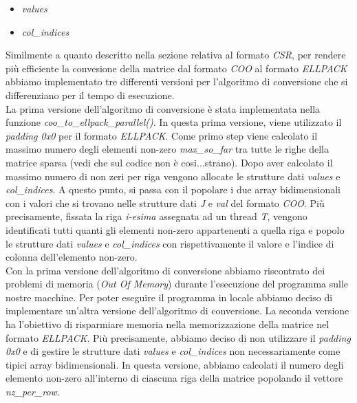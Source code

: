 \documentclass{article}
\begin{document}
\begin{itemize}
\item \textit{values}
\item \textit{col\_indices}
\end{itemize}

Similmente a quanto descritto nella sezione relativa al formato \textit{CSR}, per rendere più efficiente la convesione della matrice dal formato \textit{COO} al formato \textit{ELLPACK} abbiamo implementato tre differenti versioni per l'algoritmo di conversione che si differenziano per il tempo di esecuzione.\\

La prima versione dell'algoritmo di conversione è stata implementata nella funzione \textit{coo\_to\_ellpack\_parallel()}. In questa prima versione, viene utilizzato il \textit{padding 0x0} per il formato \textit{ELLPACK}. Come primo step viene calcolato il massimo numero degli elementi non-zero \textit{max\_so\_far} tra tutte le righe della matrice sparsa (vedi che sul codice non è cosi...strano). Dopo aver calcolato il massimo numero di non zeri per riga vengono allocate le strutture dati \textit{values} e \textit{col\_indices}. A questo punto, si passa con il popolare i due array bidimensionali con i valori che si trovano nelle strutture dati \textit{J} e \textit{val} del formato \textit{COO}. Più precisamente, fissata la riga \textit{i-esima} assegnata ad un thread \textit{T}, vengono identificati tutti quanti gli elementi non-zero appartenenti a quella riga e popolo le strutture dati \textit{values} e \textit{col\_indices} con rispettivamente il valore e l'indice di colonna dell'elemento non-zero.\\

Con la prima versione dell'algoritmo di conversione abbiamo riscontrato dei problemi di memoria (\textit{Out Of Memory}) durante l'esecuzione del programma sulle nostre macchine. Per poter eseguire il programma in locale abbiamo deciso di implementare un'altra versione dell'algoritmo di conversione. La seconda versione ha l'obiettivo di risparmiare memoria nella memorizzazione della matrice nel formato \textit{ELLPACK}. Più precisamente, abbiamo deciso di non utilizzare il \textit{padding 0x0} e di gestire le strutture dati \textit{values} e \textit{col\_indices} non necessariamente come tipici array bidimensionali. In questa versione, abbiamo calcolati il numero degli elemento non-zero all'interno di ciascuna riga della matrice popolando il vettore \textit{nz\_per\_row}.\\
\end{document}
